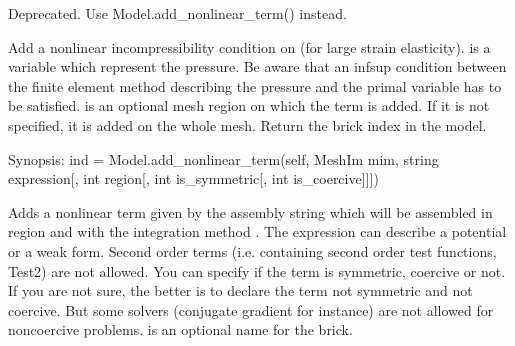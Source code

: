 \documentclass[a4paper,11pt,english]{sphinxmanual}
\begin{document}
\begin{fulllineitems}
\begin{fulllineitems}
Deprecated. Use Model.add\_nonlinear\_term() instead.

\end{fulllineitems}


\begin{fulllineitems}
\label{\detokenize{python/cmdref_Model:getfem.Model.add_nonlinear_incompressibility_brick}}
Add a nonlinear incompressibility condition on  (for large
strain elasticity). 
is a variable which represent the pressure. Be aware that an inf\sphinxhyphen{}sup
condition between the finite element method describing the pressure and the
primal variable has to be satisfied.  is an optional mesh region on
which the term is added. If it is not specified, it is added on the
whole mesh. Return the brick index in the model.

\end{fulllineitems}


\begin{fulllineitems}
\label{\detokenize{python/cmdref_Model:getfem.Model.add_nonlinear_term}}
Synopsis: ind = Model.add\_nonlinear\_term(self, MeshIm mim, string expression{[}, int region{[}, int is\_symmetric{[}, int is\_coercive{]}{]}{]})

Adds a nonlinear term given by the assembly string  which will
be assembled in region  and with the integration method .
The expression can describe a potential or a weak form. Second order
terms (i.e. containing second order test functions, Test2) are not
allowed.
You can specify if the term is symmetric, coercive or not.
If you are not sure, the better is to declare the term not symmetric
and not coercive. But some solvers (conjugate gradient for instance)
are not allowed for non\sphinxhyphen{}coercive problems.
 is an optional name for the brick.


\end{fulllineitems}
\end{fulllineitems}
\end{document}
